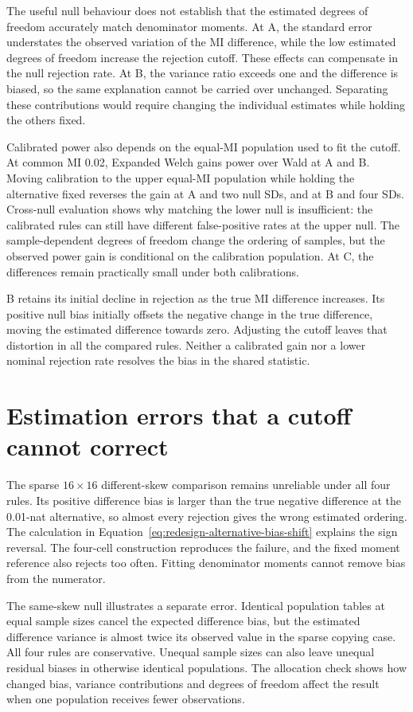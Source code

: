 The useful null behaviour does not establish that the estimated degrees
of freedom accurately match denominator moments. At A, the standard
error understates the observed variation of the MI difference, while
the low estimated degrees of freedom increase the rejection cutoff.
These effects can compensate in the null rejection rate. At B, the
variance ratio exceeds one and the difference is biased, so the same
explanation cannot be carried over unchanged. Separating these
contributions would require changing the individual estimates while
holding the others fixed.

Calibrated power also depends on the equal-MI population used to fit
the cutoff. At common MI 0.02, Expanded Welch gains power over Wald
at A and B. Moving calibration to the upper equal-MI population while
holding the alternative fixed reverses the gain at A and two null SDs,
and at B and four SDs. Cross-null evaluation shows why matching the
lower null is insufficient: the calibrated rules can still have different
false-positive rates at the upper null. The sample-dependent degrees
of freedom change the ordering of samples, but the observed power gain
is conditional on the calibration population. At C, the differences
remain practically small under both calibrations.

B retains its initial decline in rejection as the true MI difference
increases. Its positive null bias initially offsets the negative change
in the true difference, moving the estimated difference towards zero.
Adjusting the cutoff leaves that distortion in all the compared rules.
Neither a calibrated gain nor a lower nominal rejection rate resolves
the bias in the shared statistic.

\section{Estimation errors that a cutoff cannot correct}

The sparse \(16\times16\) different-skew comparison remains unreliable
under all four rules. Its positive difference bias is larger than the
true negative difference at the 0.01-nat alternative, so almost every
rejection gives the wrong estimated ordering. The calculation in
Equation~\eqref{eq:redesign-alternative-bias-shift} explains the sign
reversal. The four-cell construction reproduces the failure, and the
fixed moment reference also rejects too often. Fitting denominator
moments cannot remove bias from the numerator.

The same-skew null illustrates a separate error. Identical population
tables at equal sample sizes cancel the expected difference bias, but
the estimated difference variance is almost twice its observed value
in the sparse copying case. All four rules are conservative. Unequal
sample sizes can also leave unequal residual biases in otherwise
identical populations. The allocation check shows how changed bias,
variance contributions and degrees of freedom affect the result when
one population receives fewer observations.

